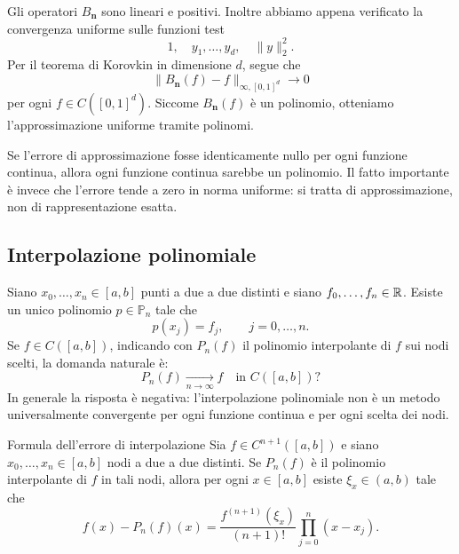 \documentclass[a4paper]{article}
\begin{document}
\begin{snippetproof}{}
    Gli operatori \(B_{\mathbf n}\) sono lineari e positivi. Inoltre abbiamo appena verificato la convergenza uniforme sulle funzioni test
    \[
        1,\quad y_1,
        \ldots,y_d,
        \quad \|y\|_2^2.
    \]
    Per il teorema di Korovkin in dimensione \(d\), segue che
    \[
        \|B_{\mathbf n}(f)-f\|_{\infty,[0,1]^d}\to 0
    \]
    per ogni \(f\in C([0,1]^d)\). Siccome \(B_{\mathbf n}(f)\) è un polinomio, otteniamo l'approssimazione uniforme tramite polinomi.
\end{snippetproof}

Se l'errore di approssimazione fosse identicamente nullo per ogni funzione continua, allora ogni funzione continua sarebbe un polinomio. Il fatto importante è invece che l'errore tende a zero in norma uniforme: si tratta di approssimazione, non di rappresentazione esatta.

\subsection{Interpolazione polinomiale}

Siano \(x_0,\ldots,x_n\in[a,b]\) punti a due a due distinti e siano \(f_0,\ldots,f_n\in\mathbb{R}\). Esiste un unico polinomio \(p\in\mathbb{P}_n\) tale che
\[
    p(x_j)=f_j,
    \qquad j=0,\ldots,n.
\]
Se \(f\in C([a,b])\), indicando con \(P_n(f)\) il polinomio interpolante di \(f\) sui nodi scelti, la domanda naturale è:
\[
    P_n(f)\xrightarrow[n\to\infty]{} f
    \quad\text{in } C([a,b])?
\]
In generale la risposta è negativa: l'interpolazione polinomiale non è un metodo universalmente convergente per ogni funzione continua e per ogni scelta dei nodi.

\begin{snippettheorem}{Formula dell'errore di interpolazione}
    Sia \(f\in C^{n+1}([a,b])\) e siano \(x_0,
    \ldots,x_n\in[a,b]\) nodi a due a due distinti. Se \(P_n(f)\) è il polinomio interpolante di \(f\) in tali nodi, allora per ogni \(x\in[a,b]\) esiste \(\xi_x\in(a,b)\) tale che
    \[
        f(x)-P_n(f)(x)
        =
        \frac{f^{(n+1)}(\xi_x)}{(n+1)!}
        \prod_{j=0}^n (x-x_j).
    \]
\end{snippettheorem}
\end{document}
